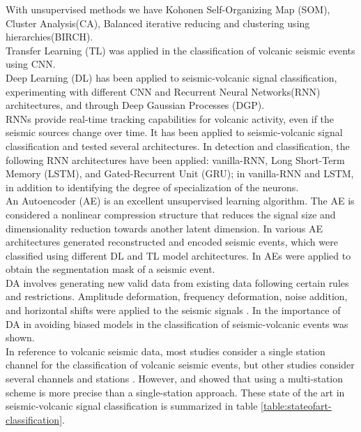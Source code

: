 \documentclass[journal]{IEEEtran}
\begin{document}
With unsupervised methods we have Kohonen Self-Organizing Map (SOM)\cite{langer2009synopsis,esposito2008unsupervised}, Cluster Analysis(CA)\cite{langer2009synopsis}, Balanced iterative reducing and clustering using hierarchies(BIRCH)\cite{duque2020exploring}. \\
Transfer Learning (TL) was applied in the classification of volcanic seismic events using CNN\cite{mythesismaster,titos2019classification}. \\
Deep Learning (DL) has been applied to seismic-volcanic signal classification, experimenting with different CNN\cite{mythesismaster} and Recurrent Neural Networks(RNN) architectures\cite{salazar2020deep,ferreira2023deep,canario2020indepth}, and through Deep Gaussian Processes (DGP)\cite{lopez2020acontribution}. \\
RNNs provide real-time tracking capabilities for volcanic activity, even if the seismic sources change over time. It has been applied to seismic-volcanic signal classification and tested several architectures\cite{salazar2020deep}. In detection and classification, the following RNN architectures have been applied: vanilla-RNN, Long Short-Term Memory (LSTM), and Gated-Recurrent Unit (GRU)\cite{titos2018detection}; in \cite{rodriguez2021bayesian} vanilla-RNN and LSTM, in addition to identifying the degree of specialization of the neurons. \\
An Autoencoder (AE) is an excellent unsupervised learning algorithm. The AE is considered a nonlinear compression structure that reduces the signal size and dimensionality reduction towards another latent dimension. In \cite{mythesismaster} various AE architectures generated reconstructed and encoded seismic events, which were classified using different DL and TL model architectures. In \cite{rodriguez2021bayesian} AEs were applied to obtain the segmentation mask of a seismic event. \\
DA involves generating new valid data from existing data following certain rules and restrictions. Amplitude deformation, frequency deformation, noise addition, and horizontal shifts were applied to the seismic signals \cite{curilem2018using}. In \cite{salazar2022multi} the importance of DA in avoiding biased models in the classification of seismic-volcanic events was shown. \\
In reference to volcanic seismic data, most studies consider a single station channel for the classification of volcanic seismic events, but other studies consider several channels and stations \cite{lara2020automatic,curilem2016pattern,maggi2017implementation,ferreira2023deep}. However, \cite{titos2019classification} and \cite{ferreira2023deep} showed that using a multi-station scheme is more precise than a single-station approach. These state of the art in seismic-volcanic signal classification is summarized in table \ref{table:stateofart-classification}.
\end{document}
